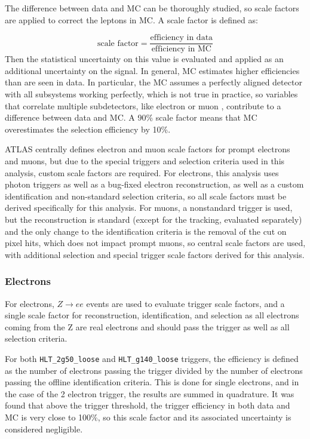 The difference between data and \ac{MC} can be thoroughly studied, so scale factors are applied to correct the leptons in MC. A scale factor is defined as:

\begin{equation}
\text{scale factor} = \frac{\text{efficiency in data}}{\text{efficiency in MC}}
\end{equation}
Then the statistical uncertainty on this value is evaluated and applied as an additional uncertainty on the signal. In general, \ac{MC} estimates higher efficiencies than are seen in data. In particular, the \ac{MC} assumes a perfectly aligned detector with all subsystems working perfectly, which is not true in practice, so variables that correlate multiple subdetectors, like electron \dpt or muon \chiCB, contribute to a difference between data and \ac{MC}. A 90\% scale factor means that \ac{MC} overestimates the selection efficiency by 10\%.   

\ac{ATLAS} centrally defines electron and muon scale factors for prompt electrons and muons, but due to the special triggers and selection criteria used in this analysis, custom scale factors are required. For electrons, this analysis uses photon triggers as well as a bug-fixed electron reconstruction, as well as a custom identification and non-standard selection criteria, so all scale factors must be derived specifically for this analysis. For muons, a nonstandard trigger is used, but the reconstruction is standard (except for the tracking, evaluated separately) and the only change to the identification criteria is the removal of the cut on pixel hits, which does not impact prompt muons, so central scale factors are used, with additional selection and special trigger scale factors derived for this analysis.


\subsubsection{Electrons}

For electrons, $Z\rightarrow ee$ events are used to evaluate trigger scale factors, and a single scale factor for reconstruction, identification, and selection as all electrons coming from the Z are real electrons and should pass the trigger as well as all selection criteria.

For both \texttt{HLT\_2g50\_loose} and \texttt{HLT\_g140\_loose} triggers, the efficiency is defined as the number of electrons passing the trigger divided by the number of electrons passing the offline identification criteria. This is done for single electrons, and in the case of the 2 electron trigger, the results are summed in quadrature. It was found that above the trigger threshold, the trigger efficiency in both data and \ac{MC} is very close to 100\%, so this scale factor and its associated uncertainty is considered negligible.

